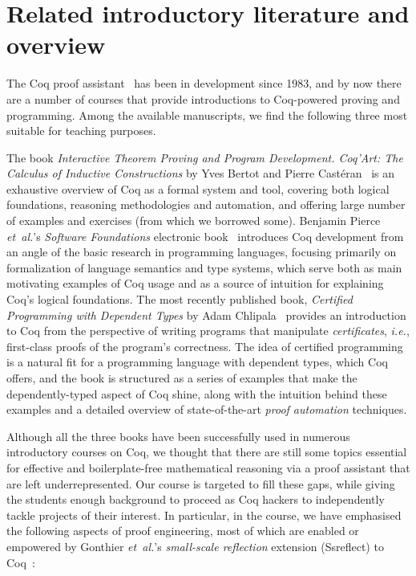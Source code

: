 \documentclass[blockstyle,preprint,nocopyrightspace]{sigplanconf}
\newcommand{\ie}{\emph{i.e.}\xspace}
\newcommand{\etal}{\emph{et~al.}\xspace}
\begin{document}
\section{Related introductory literature and overview}
\label{sec:overview}

The Coq proof assistant~\cite{Coq-manual} has been in development
since 1983, and by now there are a number of courses that provide
introductions to Coq-powered proving and programming. Among the
available manuscripts, we find the following three most suitable for
teaching purposes.

The book \emph{Interactive Theorem Proving and Program
  Development. Coq'Art: The Calculus of Inductive Constructions} by
Yves Bertot and Pierre Cast\'{e}ran~\cite{Bertot-Casteran:BOOK} is an
exhaustive overview of Coq as a formal system and tool, covering both
logical foundations, reasoning methodologies and automation, and
offering large number of examples and exercises (from which we
borrowed some).
%
Benjamin Pierce \etal's \emph{Software Foundations} electronic
book~\cite{Pierce-al:SF} introduces Coq development from an angle of
the basic research in programming languages, focusing primarily on
formalization of language semantics and type systems, which serve both
as main motivating examples of Coq usage and as a source of intuition
for explaining Coq's logical foundations.
%
The most recently published book, \emph{Certified Programming with
  Dependent Types} by Adam Chlipala~\cite{Chlipala:BOOK} provides an
introduction to Coq from the perspective of writing programs that
manipulate \emph{certificates}, \ie, first-class proofs of the
program's correctness. The idea of certified programming is a natural
fit for a programming language with dependent types, which Coq offers,
and the book is structured as a series of examples that make the
dependently-typed aspect of Coq shine, along with the intuition behind
these examples and a detailed overview of state-of-the-art \emph{proof
  automation} techniques.

Although all the three books have been successfully used in numerous
introductory courses on Coq, we thought that there are still some
topics essential for effective and boilerplate-free mathematical
reasoning via a proof assistant that are left underrepresented. Our
course is targeted to fill these gaps, while giving the students
enough background to proceed as Coq hackers to independently tackle
projects of their interest. In particular, in the course, we have
emphasised the following aspects of proof engineering, most of which
are enabled or empowered by Gonthier \etal's \emph{small-scale
  reflection} extension (Ssreflect) to Coq~\cite{Gonthier-al:TR}:
\end{document}
